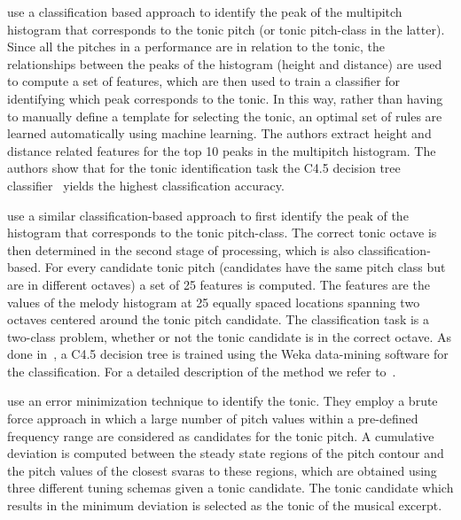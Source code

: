 \cite{salamon2012multipitch} use a classification based approach to identify the peak of the multipitch histogram that corresponds to the tonic pitch (or tonic pitch-class in the latter). Since all the pitches in a performance are in relation to the tonic, the relationships between the peaks of the histogram (height and distance) are used to compute a set of features, which are then used to train a classifier for identifying which peak corresponds to the tonic. In this way, rather than having to manually define a template for selecting the tonic, an optimal set of rules are learned automatically using machine learning. The authors extract height and distance related features for the top 10 peaks in the multipitch histogram. The authors show that for the tonic identification task the C4.5 decision tree classifier~\citep{Quinlan:1993:CPM:152181} yields the highest classification accuracy. 

\cite{gulati2012two} use a similar classification-based approach to first identify the peak of the histogram that corresponds to the tonic pitch-class. The correct tonic octave is then determined in the second stage of processing, which is also classification-based. For every candidate tonic pitch (candidates have the same pitch class but are in different octaves) a set of 25 features is computed. The features are the values of the melody histogram at 25 equally spaced locations spanning two octaves centered around the tonic pitch candidate. The classification task is a two-class problem, whether or not the tonic candidate is in the correct octave. As done in~\cite{salamon2012multipitch}, a C4.5 decision tree is trained using the Weka data-mining software for the classification. For a detailed description of the method we refer to~\cite{SGulati_MThesis2012}.

\cite{Sengupta2005b} use an error minimization technique to identify the tonic. They employ a brute force approach in which a large number of pitch values within a pre-defined frequency range are considered as candidates for the tonic pitch. A cumulative deviation is computed between the steady state regions of the pitch contour and the pitch values of the closest \glspl{svara} to these regions, which are obtained using three different tuning schemas given a tonic candidate. The tonic candidate which results in the minimum deviation is selected as the tonic of the musical excerpt.


